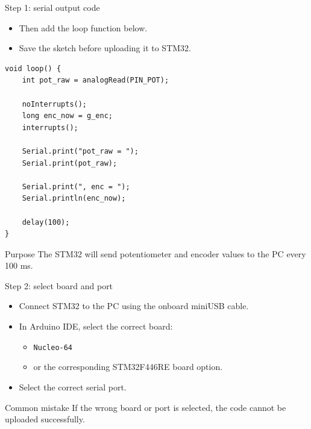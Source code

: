 \documentclass[aspectratio=169]{beamer}
\begin{document}
\begin{frame}[fragile]{Step 1: serial output code}

\begin{itemize}
    \item Then add the loop function below.
    \vspace{0.15cm}

    \item Save the sketch before uploading it to STM32.
\end{itemize}

\vspace{0.12cm}

\begin{lstlisting}[basicstyle=\ttfamily\tiny]
void loop() {
    int pot_raw = analogRead(PIN_POT);

    noInterrupts();
    long enc_now = g_enc;
    interrupts();

    Serial.print("pot_raw = ");
    Serial.print(pot_raw);

    Serial.print(", enc = ");
    Serial.println(enc_now);

    delay(100);
}
\end{lstlisting}

\vspace{0.12cm}

\begin{block}{Purpose}
\small
The STM32 will send potentiometer and encoder values to the PC every 100 ms.
\end{block}

\end{frame}



\begin{frame}{Step 2: select board and port}

\begin{itemize}
    \item Connect STM32 to the PC using the onboard miniUSB cable.
    \vspace{0.35cm}

    \item In Arduino IDE, select the correct board:
    \vspace{0.15cm}
    \begin{itemize}
        \item \texttt{Nucleo-64}
        \item or the corresponding STM32F446RE board option.
    \end{itemize}
    \vspace{0.35cm}

    \item Select the correct serial port.
\end{itemize}

\vspace{0.25cm}

\begin{alertblock}{Common mistake}
\small
If the wrong board or port is selected, the code cannot be uploaded successfully.
\end{alertblock}

\end{frame}
\end{document}
